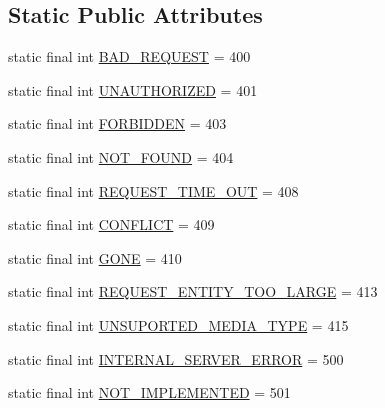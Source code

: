 \subsection*{Static Public Attributes}
\begin{DoxyCompactItemize}
\item 
static final int \hyperlink{classcom_1_1bluevia_1_1commons_1_1connector_1_1http_1_1HttpException_a183e17c60fa71ff15840ce5c9c5b4ef6}{BAD\_\-REQUEST} = 400
\item 
static final int \hyperlink{classcom_1_1bluevia_1_1commons_1_1connector_1_1http_1_1HttpException_a2e17d92c739069403b02bb64bb1b5db3}{UNAUTHORIZED} = 401
\item 
static final int \hyperlink{classcom_1_1bluevia_1_1commons_1_1connector_1_1http_1_1HttpException_aa886f0a05f07ada39b08f71ab03295a3}{FORBIDDEN} = 403
\item 
static final int \hyperlink{classcom_1_1bluevia_1_1commons_1_1connector_1_1http_1_1HttpException_a3a00e30288263a38733c41145867be6d}{NOT\_\-FOUND} = 404
\item 
static final int \hyperlink{classcom_1_1bluevia_1_1commons_1_1connector_1_1http_1_1HttpException_a03f7ad83a523e45f27f95a168ecebab6}{REQUEST\_\-TIME\_\-OUT} = 408
\item 
static final int \hyperlink{classcom_1_1bluevia_1_1commons_1_1connector_1_1http_1_1HttpException_a80c07de62eb765d21a9b7624109e79ec}{CONFLICT} = 409
\item 
static final int \hyperlink{classcom_1_1bluevia_1_1commons_1_1connector_1_1http_1_1HttpException_ad597734c6450e38ef231c40202db56c0}{GONE} = 410
\item 
static final int \hyperlink{classcom_1_1bluevia_1_1commons_1_1connector_1_1http_1_1HttpException_aaf8b36a8e3c30a77eba0827d33ceadf7}{REQUEST\_\-ENTITY\_\-TOO\_\-LARGE} = 413
\item 
static final int \hyperlink{classcom_1_1bluevia_1_1commons_1_1connector_1_1http_1_1HttpException_ae1de92d4e1fa1bbd5213b84e1f1c3224}{UNSUPORTED\_\-MEDIA\_\-TYPE} = 415
\item 
static final int \hyperlink{classcom_1_1bluevia_1_1commons_1_1connector_1_1http_1_1HttpException_a71ba76dcf56764f785ae1e0d3287711e}{INTERNAL\_\-SERVER\_\-ERROR} = 500
\item 
static final int \hyperlink{classcom_1_1bluevia_1_1commons_1_1connector_1_1http_1_1HttpException_a0deb5ee8bce98bd280111e01c0ba79f6}{NOT\_\-IMPLEMENTED} = 501
\end{DoxyCompactItemize}


